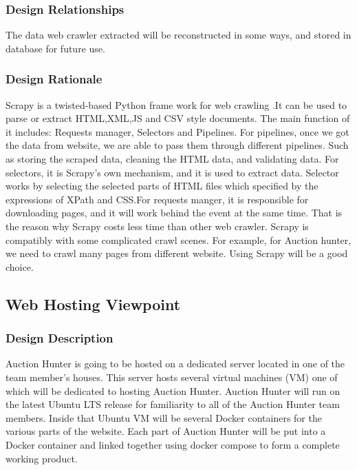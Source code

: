 \documentclass[onecolumn, draftclsnofoot, 10pt, compsoc]{IEEEtran}
\begin{document}
\subsubsection{Design Relationships}
The data web crawler extracted will be reconstructed in some ways, and stored in database for future use.
\subsubsection{Design Rationale}
Scrapy is a twisted-based Python frame work for web crawling .It can be used to parse or extract HTML,XML,JS and CSV style documents. The main function of it includes: Requests manager, Selectors and Pipelines. For pipelines, once we got the data from website, we are able to pass them through different pipelines. Such as storing the scraped data, cleaning the HTML data, and validating data. For selectors, it is Scrapy’s own mechanism, and it is used to extract data. Selector works by selecting the selected parts of HTML files which specified by the expressions of XPath and CSS.For requests manger, it is responsible for downloading pages, and it will work behind the event at the same time. That is the reason why Scrapy costs less time than other web crawler. Scrapy is compatibly with some complicated crawl scenes. For example, for Auction hunter, we need to crawl many pages from different website. Using Scrapy will be a good choice.





\subsection{Web Hosting Viewpoint}
\subsubsection{Design Description}
Auction Hunter is going to be hosted on a dedicated server located in one of the team member's houses. This server hosts several virtual machines (VM) one of which will be dedicated to hosting Auction Hunter. Auction Hunter will run on the latest Ubuntu LTS release for familiarity to all of the Auction Hunter team members. Inside that Ubuntu VM will be several Docker containers for the various parts of the website. Each part of Auction Hunter will be put into a Docker container and linked together using docker compose to form a complete working product.
\end{document}
